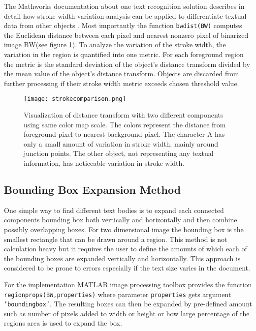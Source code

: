 \documentclass{article}
\def\code#1{\texttt{#1}}
\begin{document}
          The Mathworks documentation about one text recognition solution describes in detail how stroke width variation analysis can be applied to differentiate textual data from other objects \cite{MathworksTextRecognition}. Most importantly the function \code{bwdist(BW)} computes the Euclidean distance between each pixel and nearest nonzero pixel of binarized image BW(see figure \ref{fig:strokewidth}). To analyze the variation of the stroke width, the variation in the region is quantified into one metric. For each foreground region the metric is the standard deviation of the object's distance transform divided by the mean value of the object's distance transform. Objects are discarded from further processing if their stroke width metric exceeds chosen threshold value.

          \begin{figure}[!ht]
            \centering
            \texttt{[image: strokecomparison.png]}
            \caption{Visualization of distance transform with two different components using same color map scale. The colors represent the distance from foreground pixel to nearest background pixel. The character A has only a small amount of variation in stroke width, mainly around junction points. The other object, not representing any textual information, has noticeable variation in stroke width. \label{fig:strokewidth} }
          \end{figure}

        \subsection{Bounding Box Expansion Method}
          One simple way to find different text bodies is to expand each connected components bounding box both vertically and horizontally and then combine possibly overlapping boxes. For two dimensional image the bounding box is the smallest rectangle that can be drawn around a region. This method is not calculation heavy but it requires the user to define the amounts of which each of the bounding boxes are expanded vertically and horizontally. This approach is considered to be prone to errors especially if the text size varies in the document.

          For the implementation MATLAB image processing toolbox provides the function \code{regionprops(BW,properties)} where parameter \code{properties} gets argument \code{'boundingbox'}. The resulting boxes can then be expanded by pre-defined amount such as number of pixels added to width or height or how large percentage of the regions area is used to expand the box.
\end{document}
